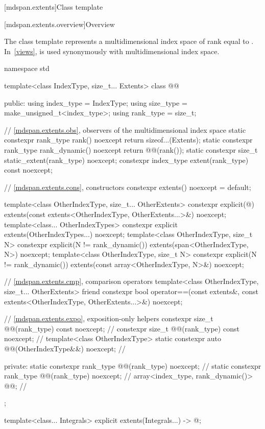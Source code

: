[mdspan.extents]{Class template }

[mdspan.extents.overview]{Overview}

The class template  represents
a multidimensional index space of rank equal to .
In~\ref{views},
 is used synonymously with multidimensional index space.

\begin{codeblock}
namespace std {
  template<class IndexType, size_t... Extents>
  class @@ {
  public:
    using index_type = IndexType;
    using size_type = make_unsigned_t<index_type>;
    using rank_type = size_t;

    // \ref{mdspan.extents.obs}, observers of the multidimensional index space
    static constexpr rank_type rank() noexcept { return sizeof...(Extents); }
    static constexpr rank_type rank_dynamic() noexcept { return @@(rank()); }
    static constexpr size_t static_extent(rank_type) noexcept;
    constexpr index_type extent(rank_type) const noexcept;

    // \ref{mdspan.extents.cons}, constructors
    constexpr extents() noexcept = default;

    template<class OtherIndexType, size_t... OtherExtents>
      constexpr explicit(@\seebelow@)
        extents(const extents<OtherIndexType, OtherExtents...>&) noexcept;
    template<class... OtherIndexTypes>
      constexpr explicit extents(OtherIndexTypes...) noexcept;
    template<class OtherIndexType, size_t N>
      constexpr explicit(N != rank_dynamic())
        extents(span<OtherIndexType, N>) noexcept;
    template<class OtherIndexType, size_t N>
      constexpr explicit(N != rank_dynamic())
        extents(const array<OtherIndexType, N>&) noexcept;

    // \ref{mdspan.extents.cmp}, comparison operators
    template<class OtherIndexType, size_t... OtherExtents>
      friend constexpr bool operator==(const extents&,
                                       const extents<OtherIndexType, OtherExtents...>&) noexcept;

    // \ref{mdspan.extents.expo}, exposition-only helpers
    constexpr size_t @@(rank_type) const noexcept;     // \expos
    constexpr size_t @@(rank_type) const noexcept;     // \expos
    template<class OtherIndexType>
      static constexpr auto @@(OtherIndexType&&) noexcept;      // \expos

  private:
    static constexpr rank_type @@(rank_type) noexcept;       // \expos
    static constexpr rank_type @@(rank_type) noexcept;   // \expos
    array<index_type, rank_dynamic()> @@{};                // \expos
  };

  template<class... Integrals>
    explicit extents(Integrals...)
      -> @\seebelow@;
}
\end{codeblock}

